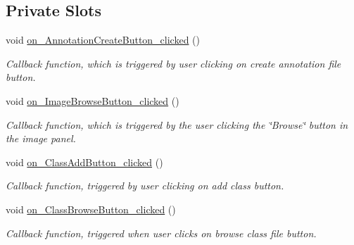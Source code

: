 \subsection*{Private Slots}
\begin{DoxyCompactItemize}
\item 
\mbox{\label{classMainView_af0436aa7323ec0580616b33adc219784}} 
void \hyperlink{classMainView_af0436aa7323ec0580616b33adc219784}{on\+\_\+\+Annotation\+Create\+Button\+\_\+clicked} ()
\begin{DoxyCompactList}\small\item\em Callback function, which is triggered by user clicking on create annotation file button. \end{DoxyCompactList}\item 
\mbox{\label{classMainView_a8e170aa23a65f1c7f3ed3a7c08a99101}} 
void \hyperlink{classMainView_a8e170aa23a65f1c7f3ed3a7c08a99101}{on\+\_\+\+Image\+Browse\+Button\+\_\+clicked} ()
\begin{DoxyCompactList}\small\item\em Callback function, which is triggered by the user clicking the \char`\"{}\+Browse\char`\"{} button in the image panel. \end{DoxyCompactList}\item 
\mbox{\label{classMainView_aaa6cd08b912bcc873f9a7c04258f98bb}} 
void \hyperlink{classMainView_aaa6cd08b912bcc873f9a7c04258f98bb}{on\+\_\+\+Class\+Add\+Button\+\_\+clicked} ()
\begin{DoxyCompactList}\small\item\em Callback function, triggered by user clicking on add class button. \end{DoxyCompactList}\item 
\mbox{\label{classMainView_a67267813d7c408d32be5e6fef2251a6f}} 
void \hyperlink{classMainView_a67267813d7c408d32be5e6fef2251a6f}{on\+\_\+\+Class\+Browse\+Button\+\_\+clicked} ()
\begin{DoxyCompactList}\small\item\em Callback function, triggered when user clicks on browse class file button. \end{DoxyCompactList}\item 
\mbox{\label{classMainView_a3edf1fc4556c571b3d2130db22da504e}} 

\end{DoxyCompactItemize}
